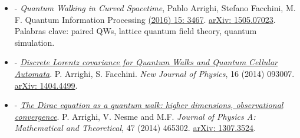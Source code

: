 \documentclass[10pt]{article}
\newenvironment{outerlist}[1][\enskip\textbullet]%
        {\begin{itemize}[#1]}{\end{itemize}%
         \vspace{-.6\baselineskip}}
\begin{document}
\begin{outerlist}
	
	\item[-] \emph{Quantum Walking in Curved Spacetime}, Pablo Arrighi, Stefano Facchini, M. F. Quantum Information Processing \href{https://link.springer.com/article/10.1007/s11128-016-1335-7}{(2016) 15: 3467}. \href{https://arxiv.org/abs/1505.07023}{arXiv: 1505.07023}. Palabras clave: paired QWs, lattice quantum field theory, quantum simulation. 
	
	\item[-] \href{http://iopscience.iop.org/1367-2630/16/9/093007/}{\emph{Discrete Lorentz covariance for Quantum Walks and Quantum Cellular Automata}}. P. Arrighi, S. Facchini. \emph{New Journal of Physics}, 16 (2014) 093007. \href{https://arxiv.org/abs/1404.4499}{arXiv: 1404.4499}.
	
	\item[-] \href{http://arxiv.org/abs/1307.3524}{\emph{The Dirac equation as a quantum walk: higher dimensions, observational convergence}}. P. Arrighi, V. Nesme and M.F. \emph{Journal of Physics A: Mathematical and Theoretical}, 47 (2014) 465302. \href{https://arxiv.org/abs/1307.3524}{arXiv: 1307.3524}.
	
\end{outerlist}
\end{document}
